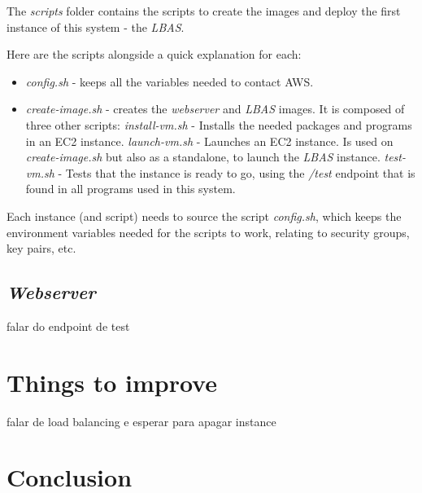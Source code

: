 \documentclass{article}
\begin{document}
The \textit{scripts} folder contains the scripts to create the images and deploy
the first instance of this system - the \textit{LBAS}.

Here are the scripts alongside a quick explanation for each:

\begin{itemize}
    \item \textit{config.sh} - keeps all the variables needed to contact AWS.
    \item \textit{create-image.sh} - creates the \textit{webserver} and \textit{LBAS}
        images. It is composed of three other scripts:
    \subitem \textit{install-vm.sh} - Installs the needed packages and programs
        in an EC2 instance.
    \subitem \textit{launch-vm.sh} - Launches an EC2 instance. Is used on
        \textit{create-image.sh} but also as a standalone, to launch the
        \textit{LBAS} instance.
    \subitem \textit{test-vm.sh} - Tests that the instance is ready to go, using
        the \textit{/test} endpoint that is found in all programs used in this
        system.
\end{itemize}

Each instance (and script) needs to source the script \textit{config.sh}, which
keeps the environment variables needed for the scripts to work, relating to
security groups, key pairs, etc.

\subsection{\textit{Webserver}}

falar do endpoint de test

\section{Things to improve}

falar de load balancing e esperar para apagar instance

\section{Conclusion}
\end{document}
